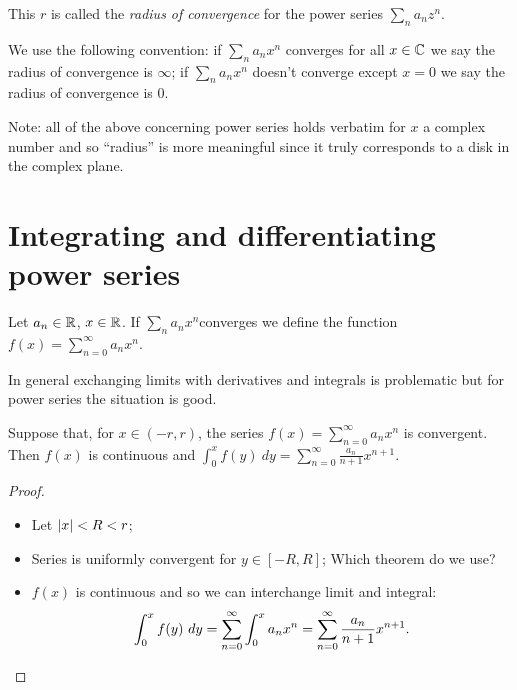 \begin{definition}
  This \(r\) is called the \emph{radius of convergence} for the power series \(\sum_n a_n z^n\).
\end{definition}

We use the following convention:
if \(\sum_n a_n x^n\) converges for all \(x\in \mathbb{C}\) we say the radius of convergence is \(\infty\);
if \(\sum_n a_n x^n\) doesn't converge except  \(x=0\) we say the radius of convergence is \(0\).

Note: all of the above concerning power series holds verbatim for \(x\) a complex number and so ``radius'' is more meaningful since it truly corresponds to a disk in the complex plane.




\section{Integrating and differentiating power series}



Let \(a_n \in \mathbb{R}\), \(x\in \mathbb{R}\).
If \(\sum_n a_n x^n\)converges we define the function \(f(x) = \sum_{n=0}^{\infty} a_n x^n\).

In general exchanging limits with derivatives and integrals is problematic but for power series the situation is good.



\begin{theorem}
  \label{thm:integrate-power}
  Suppose that, for \(x\in (-r,r)\), the series  \(f(x) = \sum_{n=0}^{\infty} a_n x^n\) is convergent.
  Then \(f(x)\) is continuous and \(\int_0^x f(y) \ dy = \sum_{n=0}^{\infty} \frac{a_n}{n+1} x^{n+1}\).
\end{theorem}

\begin{proof}
  \begin{itemize}
    \item Let \(\left|x\right|<R<r\);
    \item Series is uniformly convergent for \(y\in[-R,R]\);
          {Which theorem do we use?}
    \item \(f(x)\) is continuous and so we can interchange limit and integral: %
          \[
            \int_0^x f(y) \ dy
            = \sum_{n=0}^{\infty} \int_0^x  {a_n} x^{n}
            = \sum_{n=0}^{\infty} \frac{a_n}{n+1} x^{n+1}. \qedhere
          \]
  \end{itemize}
\end{proof}





